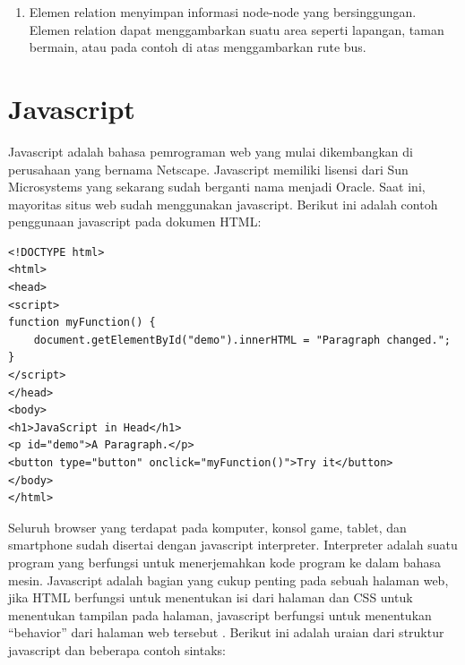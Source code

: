 \begin{itemize}
\begin{enumerate}
\item Elemen relation menyimpan informasi node-node yang bersinggungan. Elemen
relation dapat menggambarkan suatu area seperti lapangan, taman bermain, atau
pada contoh di atas menggambarkan rute bus.
\end{enumerate}
\end{itemize}

\section{Javascript}
Javascript adalah bahasa pemrograman web yang mulai dikembangkan di perusahaan
yang bernama Netscape. Javascript memiliki lisensi dari Sun Microsystems yang sekarang sudah berganti nama 
menjadi Oracle. Saat ini, mayoritas situs web sudah menggunakan javascript.
Berikut ini adalah contoh penggunaan javascript pada dokumen HTML:
\lstset{
  language=HTML
}
\begin{lstlisting}
<!DOCTYPE html>
<html>
<head>
<script>
function myFunction() {
    document.getElementById("demo").innerHTML = "Paragraph changed.";
}
</script>
</head>
<body>
<h1>JavaScript in Head</h1>
<p id="demo">A Paragraph.</p>
<button type="button" onclick="myFunction()">Try it</button>
</body>
</html> 
\end{lstlisting}
Seluruh browser yang terdapat pada komputer, konsol game, tablet, dan smartphone
sudah disertai dengan javascript interpreter. Interpreter adalah suatu program
yang berfungsi untuk menerjemahkan kode program ke dalam bahasa mesin. Javascript adalah bagian yang 
cukup penting pada sebuah halaman web, jika HTML 
berfungsi untuk menentukan isi dari halaman dan CSS untuk menentukan tampilan pada halaman, javascript 
berfungsi untuk menentukan ``behavior'' dari halaman web tersebut
\cite{Flanagan:2011}.
Berikut ini adalah uraian dari struktur javascript dan beberapa contoh sintaks:
